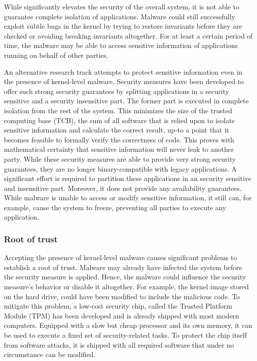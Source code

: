 

\label{sec:tpm}
While \HelloRootkitty{} significantly elevates the security of the overall system, it is not able to guarantee complete isolation of applications. Malware could still successfully exploit subtle bugs in the kernel by trying to restore invariants before they are checked or avoiding breaking invariants altogether. For at least a certain period of time, the malware may be able to access sensitive information of applications running on behalf of other parties.

An alternative research track attempts to protect sensitive information even in the presence of kernel-level malware. Security measures have been developed\citep{garfinkel2003terra,singaravelu2006ReducingTCB,mccune2008Flicker,mccune2010TrustVisor,strackx2010trustedSubsystemsInEmbeddedSystems,azab2011sice} to offer such strong security guarantees by splitting applications in a security sensitive and a security insensitive part. The former part is executed in complete isolation from the rest of the system. This minimizes the size of the trusted computing base (TCB), the sum of all software that is relied upon to isolate sensitive information and calculate the correct result, up-to a point that it becomes feasible to formally verify\citep{jacobs2008verifast} the correctness of code. This proves with mathematical certainty that sensitive information will never leak to another party. While these security measures are able to provide very strong security guarantees, they are no longer binary-compatible with legacy applications. A significant effort is required to partition these applications in an security sensitive and insensitive part. Moreover, it does not provide any availability guarantees. While malware is unable to access or modify sensitive information, it still can, for example, cause the system to freeze, preventing all parties to execute any application.

\subsubsection{Root of trust}


Accepting the presence of kernel-level malware causes significant problems to establish a root of trust. Malware may already have infected the system before the security measure is applied. Hence, the malware could influence the security measure's behavior or disable it altogether. For example, the kernel image stored on the hard drive, could have been modified to include the malicious code. To mitigate this problem, a low-cost security chip, called the Trusted Platform Module (TPM)\citep{TCG2004TPMdesign} has been developed and is already shipped with most modern computers. Equipped with a slow but cheap processor and its own memory, it can be used to execute a fixed set of security-related tasks. To protect the chip itself from software attacks, it is shipped with all required software that under no circumstance can be modified.

